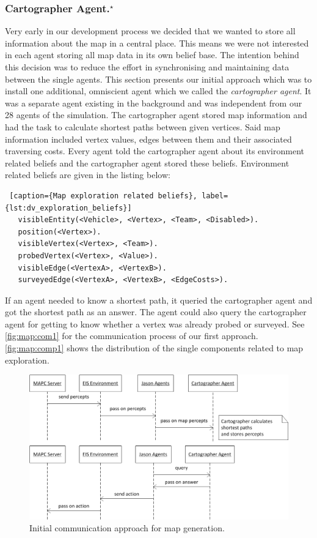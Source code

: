 \subsubsection[Cartographer Agent]{Cartographer Agent.$^\star$}\label{alg:map_cartographer}
Very early in our development process we decided that we wanted to store all information about the map in a central place.
This means we were not interested in each agent storing all map data in its own belief base.
The intention behind this decision was to reduce the effort in synchronising and maintaining data between the single agents.
This section presents our initial approach which was to install one additional, omniscient agent which we called the \emph{cartographer agent}.
It was a separate agent existing in the background and was independent from our 28 agents of the simulation.
The cartographer agent stored map information and had the task to calculate shortest paths between given vertices.
Said map information included vertex values, edges between them and their associated traversing costs.
Every agent told the cartographer agent about its environment related beliefs and the cartographer agent stored these beliefs.
Environment related beliefs are given in the listing below:
\begin{lstlisting} [caption={Map exploration related beliefs}, label={lst:dv_exploration_beliefs}]
   visibleEntity(<Vehicle>, <Vertex>, <Team>, <Disabled>).
   position(<Vertex>).
   visibleVertex(<Vertex>, <Team>).
   probedVertex(<Vertex>, <Value>).
   visibleEdge(<VertexA>, <VertexB>).
   surveyedEdge(<VertexA>, <VertexB>, <EdgeCosts>).
\end{lstlisting}

If an agent needed to know a shortest path, it queried the cartographer agent and got the shortest path as an answer.
The agent could also query the cartographer agent for getting to know whether a vertex was already probed or surveyed.
See \autoref{fig:map:com1} for the communication process of our first approach.
\autoref{fig:map:comp1} shows the distribution of the single components related to map exploration.
\begin{figure}
  \centering
  \includegraphics[width=\linewidth]{images/map_com_1.png}
  \caption{Initial communication approach for map generation.}
  \label{fig:map:com1}
\end{figure}

